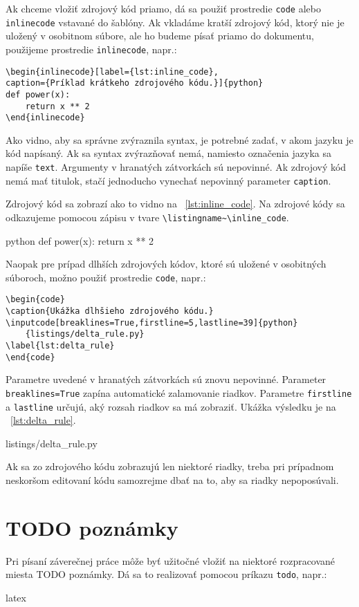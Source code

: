 Ak chceme vložiť zdrojový kód priamo, dá sa použiť prostredie \texttt{code} alebo \texttt{inlinecode} vstavané do šablóny. Ak vkladáme kratší zdrojový kód, ktorý nie je uložený v osobitnom súbore, ale ho budeme písať priamo do dokumentu, použijeme prostredie \texttt{inlinecode}, napr.:
\begin{Verbatim}
\begin{inlinecode}[label={lst:inline_code},
caption={Príklad krátkeho zdrojového kódu.}]{python}
def power(x):
	return x ** 2
\end{inlinecode}
\end{Verbatim}
Ako vidno, aby sa správne zvýraznila syntax, je potrebné zadať, v akom jazyku je kód napísaný. Ak sa syntax zvýrazňovať nemá, namiesto označenia jazyka sa napíše \texttt{text}. Argumenty v hranatých zátvorkách sú nepovinné. Ak zdrojový kód nemá mať titulok, stačí jednoducho vynechať nepovinný parameter \texttt{caption}.

Zdrojový kód sa zobrazí ako to vidno na \listingname~\ref{lst:inline_code}. Na zdrojové kódy sa odkazujeme pomocou zápisu v tvare \texttt{{\textbackslash}listingname\textasciitilde{\textbackslash}inline\_code}.

\begin{inlinecode}[label={lst:inline_code},
caption={Príklad krátkeho zdrojového kódu.}]{python}
def power(x):
	return x ** 2
\end{inlinecode}
Naopak pre prípad dlhších zdrojových kódov, ktoré sú uložené v osobitných súboroch, možno použiť prostredie \texttt{code}, napr.:
\begin{Verbatim}
\begin{code}
\caption{Ukážka dlhšieho zdrojového kódu.}
\inputcode[breaklines=True,firstline=5,lastline=39]{python}
	{listings/delta_rule.py}
\label{lst:delta_rule}
\end{code}
\end{Verbatim}

Parametre uvedené v hranatých zátvorkách sú znovu nepovinné. Parameter \texttt{breaklines=True} zapína automatické zalamovanie riadkov. Parametre \texttt{firstline} a \texttt{lastline} určujú, aký rozsah riadkov sa má zobraziť. Ukážka výsledku je na \listingname~\ref{lst:delta_rule}.
\begin{code}
\caption{Ukážka dlhšieho zdrojového kódu.}
	{listings/delta_rule.py}
\label{lst:delta_rule}
\end{code}
Ak sa zo zdrojového kódu zobrazujú len niektoré riadky, treba pri prípadnom neskoršom editovaní kódu samozrejme dbať na to, aby sa riadky nepoposúvali.

\section{TODO poznámky}

Pri písaní záverečnej práce môže byť užitočné vložiť na niektoré rozpracované miesta TODO poznámky. Dá sa to realizovať pomocou príkazu \texttt{todo}, napr.:
\begin{inlinecode}{latex}
\end{inlinecode}

